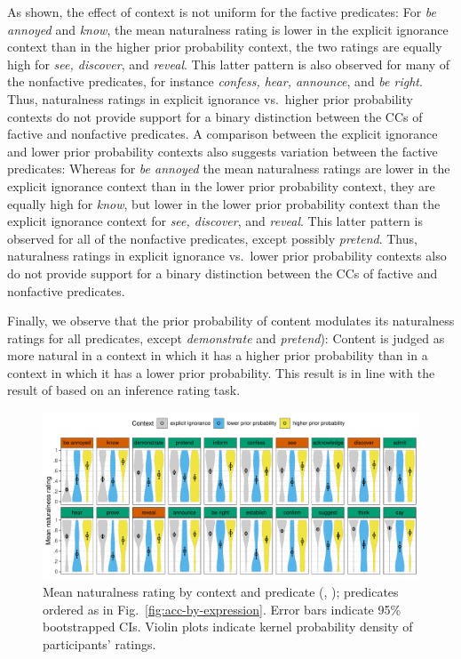 \documentclass[11pt,fleqn]{article}
\newcommand{\6}{\mbox{$[\hspace*{-.6mm}[$}}
\newcommand{\9}{\mbox{$]\hspace*{-.6mm}]$}}
\begin{document}
As shown, the effect of context is not uniform for the factive predicates: For {\em be annoyed} and {\em know}, the mean naturalness rating is lower in the explicit ignorance context than in the higher prior probability context, the two ratings are equally high for {\em see, discover}, and {\em reveal}. This latter pattern is also observed for many of the nonfactive predicates, for instance {\em confess, hear, announce}, and {\em be right}. Thus, naturalness ratings in explicit ignorance vs.\ higher prior probability contexts do not provide support for a binary distinction between the CCs of factive and nonfactive predicates. A comparison between the explicit ignorance and lower prior probability contexts also suggests variation between the factive predicates: Whereas for {\em be annoyed} the mean naturalness ratings are lower in the explicit ignorance context than in the lower prior probability context, they are equally high for {\em know}, but lower in the lower prior probability context than the explicit ignorance context for {\em see, discover}, and {\em reveal}. This latter pattern is observed for all of the nonfactive predicates, except possibly {\em pretend}. Thus, naturalness ratings in explicit ignorance vs.\ lower prior probability contexts also do not provide support for a binary distinction between the CCs of factive and nonfactive predicates. 

Finally, we observe that the prior probability of content modulates its naturalness ratings for all predicates, except {\em demonstrate} and {\em pretend}): Content is judged as more natural in a context in which it has a higher prior probability than in a context in which it has a lower prior probability. This result is in line with the result of \citealt{degen-tonhauser-openmind} based on an inference rating task.

\begin{figure}[h!]
\centering
\includegraphics[width=\textwidth]{../../results/main/13explicitIgnorance/graphs/naturalness-by-context-and-predicate}
\caption{\small{Mean naturalness rating by context and predicate (, ); predicates ordered as in Fig.~\ref{fig:acc-by-expression}. Error bars indicate 95\% bootstrapped CIs. Violin plots indicate kernel probability density of participants' ratings}.}\label{fig:acc-by-context}
\end{figure}
\end{document}
